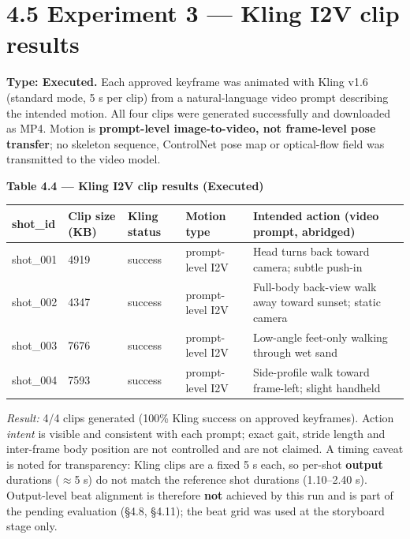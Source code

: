 \documentclass[10pt,twocolumn,letterpaper]{article}
\begin{document}
\section*{4.5 Experiment 3 --- Kling I2V clip results}

\textbf{Type: Executed.} Each approved keyframe was animated with Kling v1.6 (standard mode, 5 s per clip) from a natural-language video prompt describing the intended motion. All four clips were generated successfully and downloaded as MP4. Motion is \textbf{prompt-level image-to-video, not frame-level pose transfer}; no skeleton sequence, ControlNet pose map or optical-flow field was transmitted to the video model.

\begin{table}[t]
\centering
{\footnotesize\textbf{\textbf{Table 4.4 --- Kling I2V clip results (Executed)}}}\par\vspace{3pt}
\footnotesize
\begin{tabularx}{\textwidth}{lll>{\RaggedRight\arraybackslash}X>{\RaggedRight\arraybackslash}X}
\toprule
shot\_id & Clip size (KB) & Kling status & Motion type & Intended action (video prompt, abridged) \\
\midrule
shot\_001 & 4919 & success & prompt-level I2V & Head turns back toward camera; subtle push-in \\
shot\_002 & 4347 & success & prompt-level I2V & Full-body back-view walk away toward sunset; static camera \\
shot\_003 & 7676 & success & prompt-level I2V & Low-angle feet-only walking through wet sand \\
shot\_004 & 7593 & success & prompt-level I2V & Side-profile walk toward frame-left; slight handheld \\
\bottomrule
\end{tabularx}
\end{table}

\emph{Result:} 4/4 clips generated (100\% Kling success on approved keyframes). Action \emph{intent} is visible and consistent with each prompt; exact gait, stride length and inter-frame body position are not controlled and are not claimed. A timing caveat is noted for transparency: Kling clips are a fixed 5 s each, so per-shot \textbf{output} durations ($\approx$5 s) do not match the reference shot durations (1.10--2.40 s). Output-level beat alignment is therefore \textbf{not} achieved by this run and is part of the pending evaluation (\S{}4.8, \S{}4.11); the beat grid was used at the storyboard stage only.
\end{document}
